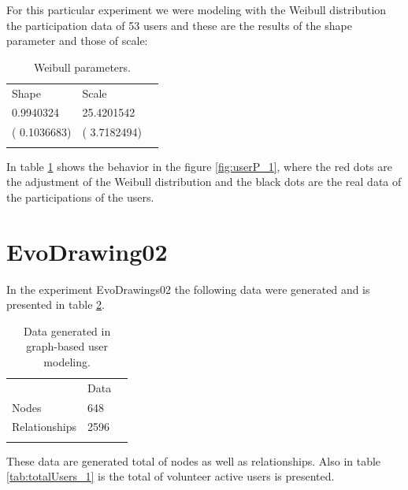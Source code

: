 For this particular experiment we were modeling with the Weibull distribution \cite{weibull1951wide}
the participation data of 53 users and these are the results of the shape parameter
and those of scale:

\begin{table}
\small
\caption{Weibull parameters.}
\label{tab:weibullp_1}
\centering
\small
\begin{tabular}{p{3cm} p{3cm} p{3cm} }
\hline\noalign{\smallskip}
Shape  & Scale &  \\
\noalign{\smallskip}\hline\noalign{\smallskip}
\small{0.9940324} & \small{25.4201542} & \\ \hline
\small{( 0.1036683)} & \small{( 3.7182494)} & \\ \hline

\noalign{\smallskip}\hline
\end{tabular}
\end{table}

In table \ref{tab:weibullp_1} shows the behavior in the figure
\ref{fig:userP_1}, where the red dots are the adjustment of the Weibull
distribution and the black dots are the real data of the participations of the
users.



\section {EvoDrawing02}


In the experiment EvoDrawings02 the following data were generated and is
presented in table \ref{tab:dataGenerated_2}.


\begin{table}
\small
\caption{Data generated in graph-based user modeling.}
\label{tab:dataGenerated_2}
\centering
\small
\begin{tabular}{p{3cm} p{3cm} p{3cm} }
\hline\noalign{\smallskip}
  & Data &  \\
\noalign{\smallskip}\hline\noalign{\smallskip}
\small{Nodes} & \small{648} & \\ \hline
\small{Relationships} & \small{2596} & \\ \hline

\noalign{\smallskip}\hline
\end{tabular}
\end{table}

These data are generated total of nodes as well as relationships. Also in table
\ref{tab:totalUsers_1} is the total of volunteer active users is presented.

